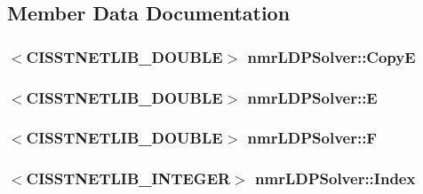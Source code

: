\subsection{Member Data Documentation}
\hypertarget{classnmr_l_d_p_solver_a421efd168683e0116dafff04eec37200}{
\subsubsection[{Copy\-E}]{$<$C\-I\-S\-S\-T\-N\-E\-T\-L\-I\-B\-\_\-\-D\-O\-U\-B\-L\-E$>$ nmr\-L\-D\-P\-Solver\-::\-Copy\-E\hspace{0.3cm}{\ttfamily [protected]}}}\label{classnmr_l_d_p_solver_a421efd168683e0116dafff04eec37200}
\hypertarget{classnmr_l_d_p_solver_a344c1e26e6c33572041e1260a3fe9365}{
\subsubsection[{E}]{$<$C\-I\-S\-S\-T\-N\-E\-T\-L\-I\-B\-\_\-\-D\-O\-U\-B\-L\-E$>$ nmr\-L\-D\-P\-Solver\-::\-E\hspace{0.3cm}{\ttfamily [protected]}}}\label{classnmr_l_d_p_solver_a344c1e26e6c33572041e1260a3fe9365}
\hypertarget{classnmr_l_d_p_solver_a0b71d56e0b8a6bbf2f1111d07cf59d36}{
\subsubsection[{F}]{$<$C\-I\-S\-S\-T\-N\-E\-T\-L\-I\-B\-\_\-\-D\-O\-U\-B\-L\-E$>$ nmr\-L\-D\-P\-Solver\-::\-F\hspace{0.3cm}{\ttfamily [protected]}}}\label{classnmr_l_d_p_solver_a0b71d56e0b8a6bbf2f1111d07cf59d36}
\hypertarget{classnmr_l_d_p_solver_a5dcd4ece4fd96ef31855281ea0555762}{
\subsubsection[{Index}]{$<$C\-I\-S\-S\-T\-N\-E\-T\-L\-I\-B\-\_\-\-I\-N\-T\-E\-G\-E\-R$>$ nmr\-L\-D\-P\-Solver\-::\-Index\hspace{0.3cm}{\ttfamily [protected]}}}\label{classnmr_l_d_p_solver_a5dcd4ece4fd96ef31855281ea0555762}
